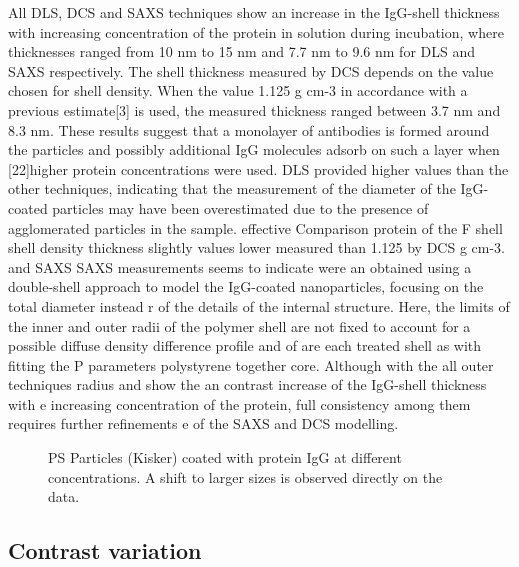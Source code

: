 All DLS, DCS and SAXS techniques show an increase in the IgG-shell thickness with increasing concentration of the protein in solution during incubation, where thicknesses ranged from 10 nm to 15 nm and 7.7 nm to 9.6 nm for DLS and SAXS respectively. The shell thickness measured by DCS depends on the value chosen for shell density. When the value 1.125 g cm-3 in accordance with a previous estimate[3] is used, the measured thickness ranged between 3.7 nm and 8.3 nm. These results suggest that a monolayer of antibodies is formed around the particles and possibly additional IgG molecules adsorb on such a layer when
[22]higher protein concentrations were used. DLS provided higher values than the other techniques, indicating that the measurement of the diameter of the IgG-coated particles may have been overestimated due to the presence of agglomerated particles in the sample. effective Comparison protein of the F shell shell density thickness slightly values lower measured than 1.125 by DCS g cm-3. and SAXS SAXS measurements seems to indicate were  an obtained using a double-shell approach to model the IgG-coated nanoparticles, focusing on the total diameter instead r of the details of the internal structure. Here, the limits of the inner and outer radii of the polymer shell are not fixed to account for a possible diffuse density difference profile and of are each treated shell as with fitting the P parameters polystyrene together core. Although with the all outer techniques radius and show the an contrast  increase of the IgG-shell thickness with e  increasing concentration of the protein, full consistency among them requires further refinements e of the SAXS and DCS modelling. 


\begin{figure}
	\centering
		\caption{PS Particles (Kisker) coated with protein IgG at different concentrations. A shift to larger sizes is observed directly on the data.}
\end{figure}

\subsection{Contrast variation}

